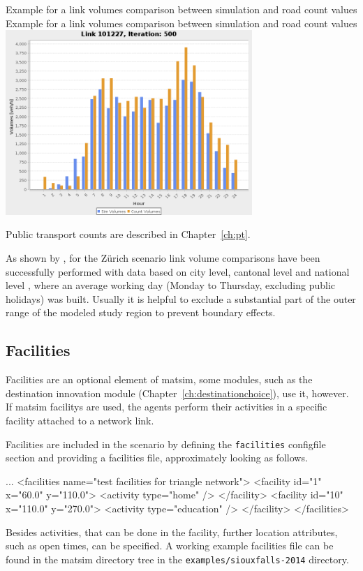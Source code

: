 \createfigure%
{Example for a link volumes comparison between simulation and road count values}%
{Example for a link volumes comparison between simulation and road count values}%
{\label{fig:countcomparison}}%
{\includegraphics[width=0.7\textwidth, angle=0]{extending/figures/link101227.png}}%
{}

Public transport counts are described in Chapter~\ref{ch:pt}. 

As shown by \citet[][]{BalmerEtAl_ResRep_bdktzrh_2009}, for the Zürich scenario link volume comparisons have been successfully performed with data based on city level, cantonal level and national level \citep[][]{ASTRA_Webpage_2006}, where an average working day (Monday to Thursday, excluding public holidays) was built. Usually it is helpful to exclude a substantial part of the outer range of the modeled study region to prevent boundary effects.


\subsection{Facilities}
\label{sec:extending-facilities}
Facilities are an optional element of \gls{matsim}, some \glspl{module}, such as the destination innovation module (Chapter~\ref{ch:destinationchoice}), use it, however.
If \gls{matsim} \glspl{facility} are used, the agents perform their activities in a specific \gls{facility} attached to a network link. 

Facilities are included in the scenario by defining the \lstinline|facilities| \gls{configfile} section and providing a facilities file, approximately looking as follows.
%
\begin{xml}
...
<facilities name="test facilities for triangle network">
	<facility id="1" x="60.0" y="110.0">
		<activity type="home" />
	</facility>
	<facility id="10" x="110.0" y="270.0">
		<activity type="education" />
	</facility>
</facilities>
\end{xml}
%
Besides activities, that can be done in the facility, further location attributes, such as open times, can be specified. 
A working example facilities file can be found in the \gls{matsim} directory tree in the \lstinline{examples/siouxfalls-2014} directory.

